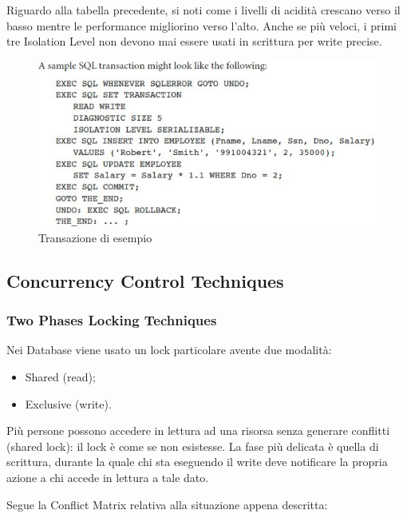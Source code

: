 Riguardo alla tabella precedente, si noti come i livelli di acidità crescano verso il basso mentre le performance migliorino verso l’alto. Anche se più veloci, i primi tre Isolation Level non devono mai essere usati in scrittura per write precise.

\begin{center}
\begin{figure}[H]
\centering
\includegraphics[scale=1]{figures/trans_example.png}
\caption{Transazione di esempio}
\end{figure}
\end{center}


\subsection{Concurrency Control Techniques}

\subsubsection{Two Phases Locking Techniques}

Nei Database viene usato un lock particolare avente due modalità:

\begin{itemize}

\item Shared (read);
\item Exclusive (write). 

\end{itemize}

Più persone possono accedere in lettura ad una risorsa senza generare conflitti (shared lock): il lock è come se non esistesse. La fase più delicata è quella di scrittura, durante la quale chi sta eseguendo il write deve notificare la propria azione a chi accede in lettura a tale dato.  

Segue la Conflict Matrix relativa alla situazione appena descritta:

